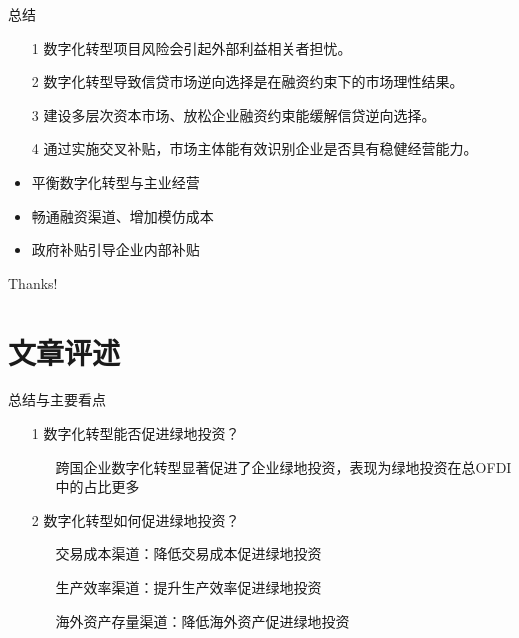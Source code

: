 \documentclass{beamer}
\begin{document}
\begin{frame}{总结}
	\begin{itemize}
		\item[1] 数字化转型项目风险会引起外部利益相关者担忧。
		\item[2] 数字化转型导致信贷市场逆向选择是在融资约束下的市场理性结果。
		\item[3] 建设多层次资本市场、放松企业融资约束能缓解信贷逆向选择。
		\item[4] 通过实施交叉补贴，市场主体能有效识别企业是否具有稳健经营能力。
	\end{itemize}
\end{frame}
\begin{frame}
	\begin{itemize}
		\item 平衡数字化转型与主业经营
		\item 畅通融资渠道、增加模仿成本
		\item 政府补贴引导企业内部补贴
	\end{itemize}
\end{frame}
\begin{frame}
    \begin{center}
        {\Huge\calligra Thanks!}
    \end{center}
\end{frame}

\section{文章评述}

\begin{frame}{总结与主要看点}
	\begin{itemize}
		\item[1] 数字化转型能否促进绿地投资？
		\begin{itemize}
			\item[] 跨国企业数字化转型显著促进了企业绿地投资，表现为绿地投资在总OFDI中的占比更多
		\end{itemize}
		\item[]
		\item[2] 数字化转型如何促进绿地投资？
		\begin{itemize}
			\item[] 交易成本渠道：降低交易成本促进绿地投资
			\item[] 生产效率渠道：提升生产效率促进绿地投资
			\item[] 海外资产存量渠道：降低海外资产促进绿地投资
		\end{itemize}
	\end{itemize}
\end{frame}
\end{document}
